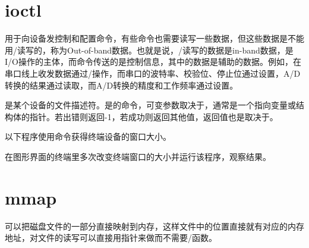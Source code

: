 


\section{ioctl}
%
用于向设备发控制和配置命令，有些命令也需要读写一些数据，但这些数据是不能用/读写的，称为Out-of-band数据。也就是说，/读写的数据是in-band数据，是I/\BookSplit{}O操作的主体，而命令传送的是控制信息，其中的数据是辅助的数据。例如，在串口线上收发数据通过/操作，而串口的波特率、校验位、停止位通过设置，A/\BookSplit{}D转换的结果通过读取，而A/\BookSplit{}D转换的精度和工作频率通过设置。




是某个设备的文件描述符。是的命令，可变参数取决于，通常是一个指向变量或结构体的指针。若出错则返回-1，若成功则返回其他值，返回值也是取决于。



以下程序使用命令获得终端设备的窗口大小。




在图形界面的终端里多次改变终端窗口的大小并运行该程序，观察结果。




\section{mmap}
%
可以把磁盘文件的一部分直接映射到内存，这样文件中的位置直接就有对应的内存地址，对文件的读写可以直接用指针来做而不需要/函数。



